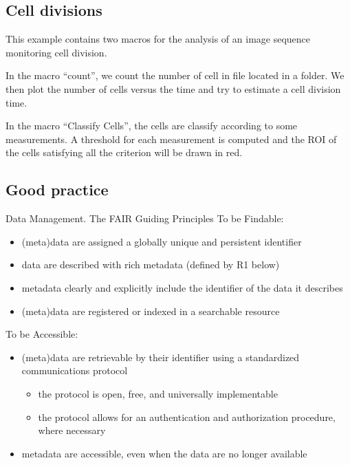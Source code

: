 { 
\subsection{Cell divisions}
This example contains two macros for the analysis of an image sequence
monitoring cell division.

In the macro ``count'', we count the number of cell in file located in
a folder. We then plot the number of cells versus the time and try to
estimate a cell division time.

In the macro ``Classify Cells'', the cells are classify according to
some measurements. A threshold for each measurement is computed and
the ROI of the cells satisfying all the criterion will be drawn in
red.



} %

\subsection{Good practice}

\begin{frame}{Data Management. The FAIR Guiding Principles} 
To be Findable:
\begin{itemize}
\item (meta)data are assigned a globally unique and persistent identifier
\item data are described with rich metadata (defined by R1 below)
\item metadata clearly and explicitly include the identifier of the data it describes
\item (meta)data are registered or indexed in a searchable resource
\end{itemize}

To be Accessible:
\begin{itemize}
\item (meta)data are retrievable by their identifier using a standardized communications protocol
\begin{itemize}
\item the protocol is open, free, and universally implementable
\item the protocol allows for an authentication and authorization procedure, where necessary
\end{itemize}
\item metadata are accessible, even when the data are no longer available
\end{itemize}
\end{frame}

